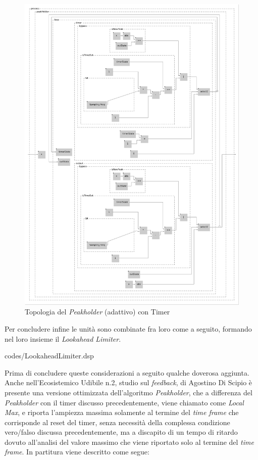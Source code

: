 \begin{figure}[h!]
    \begin{center}
        \includegraphics[width=15cm]{figures/PeakHolderAdaptive.pdf}
        \caption{Topologia del \textit{Peakholder} (adattivo) con Timer}
    \end{center}
    \vspace{0.5cm}
    \end{figure}

\clearpage 

Per concludere infine le unità sono combinate fra loro come a seguito,
formando nel loro insieme il \textit{Lookahead Limiter}.

\vspace{0.5cm} 

{codes/LookaheadLimiter.dsp}

Prima di concludere queste considerazioni a seguito qualche doverosa aggiunta.
Anche nell'Ecosistemico Udibile n.2, studio sul \emph{feedback}, di Agostino Di Scipio è presente 
una versione ottimizzata dell'algoritmo \textit{Peakholder}, che a differenza
del \textit{Peakholder} con il timer discusso precedentemente, viene chiamato come
\textit{Local Max}, e riporta l'ampiezza massima solamente al termine del \textit{time frame} che corrisponde
al reset del timer, senza necessità della complessa condizione vero/falso discussa precedentemente, 
ma a discapito di un tempo di ritardo dovuto all'analisi del valore massimo che viene riportato 
solo al termine del \textit{time frame}.
In partitura viene descritto come segue:

